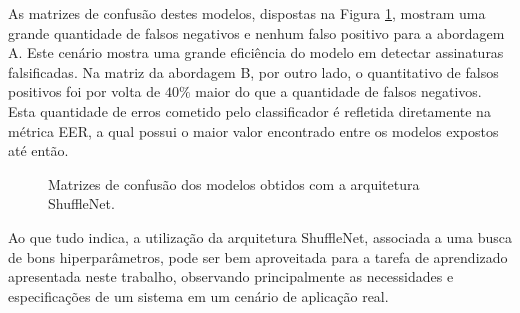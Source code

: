 As matrizes de confusão destes modelos, dispostas na Figura \ref{fig:matrizes-shufflenet}, mostram uma grande quantidade de falsos negativos e nenhum falso positivo para a abordagem A. Este cenário mostra uma grande eficiência do modelo em detectar assinaturas falsificadas. Na matriz da abordagem B, por outro lado, o quantitativo de falsos positivos foi por volta de $40\%$ maior do que a quantidade de falsos negativos. Esta quantidade de erros cometido pelo classificador é refletida diretamente na métrica EER, a qual possui o maior valor encontrado entre os modelos expostos até então.
    
\begin{figure}[h]
    \centering
    \caption{Matrizes de confusão dos modelos obtidos com a arquitetura ShuffleNet.}\label{fig:matrizes-shufflenet}
    \hfill
\end{figure}

Ao que tudo indica, a utilização da arquitetura ShuffleNet, associada a uma busca de bons hiperparâmetros, pode ser bem aproveitada para a tarefa de aprendizado apresentada neste trabalho, observando principalmente as necessidades e especificações de um sistema em um cenário de aplicação real.